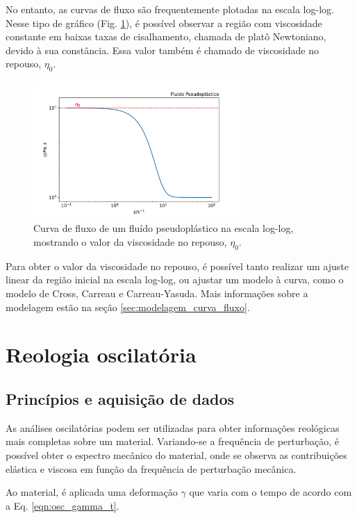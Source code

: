 			No entanto, as curvas de fluxo são frequentemente plotadas na escala log-log. Nesse tipo de gráfico (Fig. \ref{fig:reol_pseudoplastico_loglog}), é possível observar a região com viscosidade constante em baixas taxas de cisalhamento, chamada de platô Newtoniano, devido à sua constância. Essa valor também é chamado de viscosidade no repouso, \(\eta_0\).
			
			\begin{figure}[H]
				\centering
				\includegraphics[width=0.7\textwidth]{./imagens/reologia/Pseudoplastico_loglog}
				\caption{Curva de fluxo de um fluído pseudoplástico na escala log-log, mostrando o valor da viscosidade no repouso, \(\eta_0\).}
				\label{fig:reol_pseudoplastico_loglog}
			\end{figure}
		
			Para obter o valor da viscosidade no repouso, é possível tanto realizar um ajuste linear da região inicial na escala log-log, ou ajustar um modelo à curva, como o modelo de Cross, Carreau e Carreau-Yasuda. Mais informações sobre a modelagem estão na seção \ref{sec:modelagem_curva_fluxo}.

		\section{Reologia oscilatória}
			\subsection{Princípios e aquisição de dados}
			
			As análises oscilatórias podem ser utilizadas para obter informações reológicas mais completas sobre um material. Variando-se a frequência de perturbação, é possível obter o espectro mecânico do material, onde se observa as contribuições elástica e viscosa em função da frequência de perturbação mecânica.
			
			Ao material, é aplicada uma deformação \(\gamma\) que varia com o tempo de acordo com a Eq. \ref{eqn:osc_gamma_t}.
			
